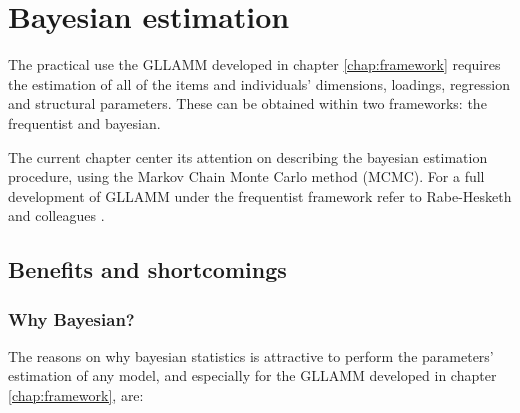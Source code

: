 \chapter{Bayesian estimation } \label{chap:estimation}

The practical use the GLLAMM developed in chapter \ref{chap:framework} requires the estimation of all of the items and individuals' dimensions, loadings, regression and structural parameters. These can be obtained within two frameworks: the frequentist and bayesian. 

The current chapter center its attention on describing the bayesian estimation procedure, using the Markov Chain Monte Carlo method (MCMC). For a full development of GLLAMM under the frequentist framework refer to Rabe-Hesketh and colleagues \cite{Rabe_et_al_2004a, Rabe_et_al_2004b, Skrondal_et_al_2004a, Rabe_et_al_2012}.


\section{Benefits and shortcomings}

\subsection{Why Bayesian?}

The reasons on why bayesian statistics is attractive to perform the parameters' estimation of any model, and especially for the GLLAMM developed in chapter \ref{chap:framework}, are:

